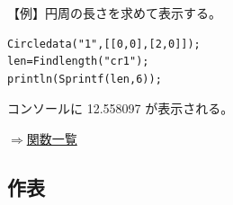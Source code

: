 \documentclass[papersize,a4paper,10pt,uplatex]{jsarticle}
\begin{document}
\begin{description}
\vspace{\baselineskip}
【例】円周の長さを求めて表示する。
\begin{verbatim}
Circledata("1",[[0,0],[2,0]]);
len=Findlength("cr1");
println(Sprintf(len,6)); 
\end{verbatim}

コンソールに 12.558097 が表示される。

\begin{flushright}\hyperlink{functionlist}{$\Rightarrow$関数一覧}\end{flushright}

\end{description}
\subsection{作表}
\end{document}

